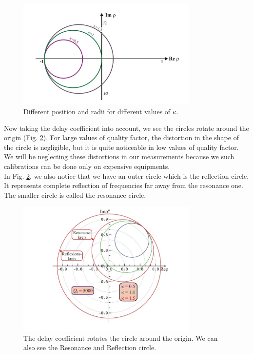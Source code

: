 \documentclass[a4paper]{report}
\numberwithin{equation}{section}
\begin{document}
\begin{figure}[hbt!]
    \centering
    \includegraphics[width=0.8\textwidth]{circles}
	\caption{Different position and radii for different values of $\kappa$. \cite{Hillert}}
    \label{fig:circles}
\end{figure}

Now taking the delay coefficient into account, we see the circles rotate around the origin (Fig. \ref{fig:delay}). For large values of quality factor, the distortion in the shape of the circle is negligible, but it is quite noticeable in low values of quality factor. We will be neglecting these distortions in our measurements because we such calibrations can be done only on expensive equipments. \\
In Fig. \ref{fig:delay}, we also notice that we have an outer circle which is the reflection circle. It represents complete reflection of frequencies far away from the resonance one. The smaller circle is called the resonance circle. 

\begin{figure}[hbt!]
    \centering
    \includegraphics[width=0.8\textwidth]{delay}
	\caption{The delay coefficient rotates the circle around the origin. We can also see the Resonance and Reflection circle. \cite{Hillert}}
    \label{fig:delay}
\end{figure}
\end{document}
